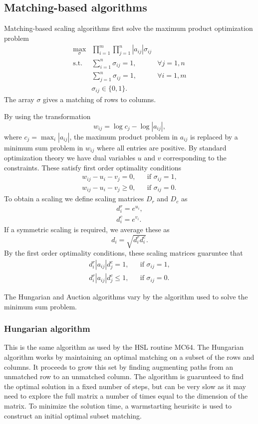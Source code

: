 \subsection{Matching-based algorithms}

Matching-based scaling algorithms first solve the maximum product optimization
problem
\begin{eqnarray*}
   \max_{\sigma} & \prod_{i=1}^m\prod_{j=1}^n |a_{ij}|\sigma_{ij} & \\
   \mathrm{s.t.} & \sum_{i=1}^n\sigma_{ij} = 1, & \forall j=1,n \\
                 & \sum_{j=1}^n\sigma_{ij} = 1, & \forall i=1,m \\
                 & \sigma_{ij} \in \{0,1\}.
\end{eqnarray*}
The array $\sigma$ gives a matching of rows to columns.

By using the transformation
$$
   w_{ij} = \log c_j - \log |a_{ij}|,
$$
where $c_j = \max_i |a_{ij}|$, the maximum product problem in $a_{ij}$ is
replaced by a minimum sum problem in $w_{ij}$ where all entries are positive.
By standard optimization theory we have dual variables $u$ and $v$ corresponding
to the constraints. These satisfy first order optimality conditions
\begin{eqnarray*}
   w_{ij} - u_i - v_j = 0, && \mbox{if } \sigma_{ij }=1, \\
   w_{ij} - u_i - v_j \ge 0, && \mbox{if } \sigma_{ij }=0.
\end{eqnarray*}
To obtain a scaling we define scaling matrices $D_r$ and $D_c$ as
\begin{eqnarray*}
   & d^r_i = e^{u_i}, & \\
   & d^c_i = e^{v_i}. &
\end{eqnarray*}
If a symmetric scaling is required, we average these as
$$
   d_i = \sqrt{d^r_id^c_i}.
$$
By the first order optimality conditions, these scaling matrices guaruntee that
\begin{eqnarray*}
   d^r_i|a_{ij}|d^c_j = 1, && \mbox{if } \sigma_{ij}=1, \\
   d^r_i|a_{ij}|d^c_j \le 1, && \mbox{if } \sigma_{ij}=0.
\end{eqnarray*}

The Hungarian and Auction algorithms vary by the algorithm used to solve the
minimum sum problem.

\subsubsection{Hungarian algorithm}
This is the same algorithm as used by the HSL routine MC64.
The Hungarian algorithm works by maintaining an optimal matching on a subset of
the rows and columns. It proceeds to grow this set by finding augmenting paths
from an unmatched row to an unmatched column. The algorithm is guarunteed to
find the optimal solution in a fixed number of steps, but can be very slow as
it may need to explore the full matrix a number of times equal to the dimension
of the matrix. To minimize the solution time, a warmstarting heurisitc is used
to construct an initial optimal subset matching.

